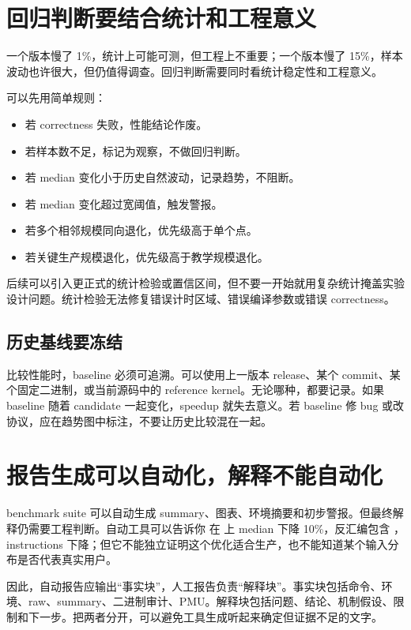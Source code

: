 \section{回归判断要结合统计和工程意义}

一个版本慢了 1\%，统计上可能可测，但工程上不重要；一个版本慢了 15\%，样本波动也许很大，但仍值得调查。回归判断需要同时看统计稳定性和工程意义。

可以先用简单规则：

\begin{itemize}
  \item 若 correctness 失败，性能结论作废。
  \item 若样本数不足，标记为观察，不做回归判断。
  \item 若 median 变化小于历史自然波动，记录趋势，不阻断。
  \item 若 median 变化超过宽阈值，触发警报。
  \item 若多个相邻规模同向退化，优先级高于单个点。
  \item 若关键生产规模退化，优先级高于教学规模退化。
\end{itemize}

后续可以引入更正式的统计检验或置信区间，但不要一开始就用复杂统计掩盖实验设计问题。统计检验无法修复错误计时区域、错误编译参数或错误 correctness。

\subsection{历史基线要冻结}

比较性能时，baseline 必须可追溯。可以使用上一版本 release、某个 commit、某个固定二进制，或当前源码中的 reference kernel。无论哪种，都要记录。如果 baseline 随着 candidate 一起变化，speedup 就失去意义。若 baseline 修 bug 或改协议，应在趋势图中标注，不要让历史比较混在一起。

\section{报告生成可以自动化，解释不能自动化}

benchmark suite 可以自动生成 summary、图表、环境摘要和初步警报。但最终解释仍需要工程判断。自动工具可以告诉你  在  上 median 下降 10\%，反汇编包含 ， instructions 下降；但它不能独立证明这个优化适合生产，也不能知道某个输入分布是否代表真实用户。

因此，自动报告应输出“事实块”，人工报告负责“解释块”。事实块包括命令、环境、raw、summary、二进制审计、PMU。解释块包括问题、结论、机制假设、限制和下一步。把两者分开，可以避免工具生成听起来确定但证据不足的文字。

